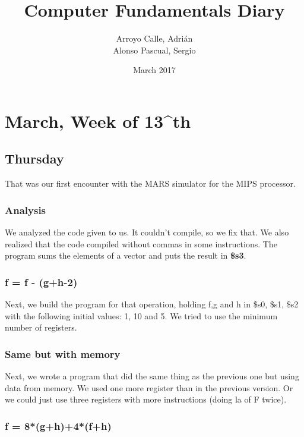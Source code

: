 \documentclass{report}
\title{Computer Fundamentals Diary}
\author{Arroyo Calle, Adrián \\ Alonso Pascual, Sergio}
\date{March 2017}
\begin{document}
\maketitle

\tableofcontents

\chapter{March, Week of 13^{th}}

\section{Thursday}

That was our first encounter with the MARS simulator for the MIPS processor.

\subsection{Analysis}

We analyzed the code given to us. It couldn't compile, so we fix that. We also realized that the code compiled without commas in some instructions. The program sums the elements of a vector and puts the result in \textbf{\$s3}.

\subsection{f = f - (g+h-2) }

Next, we build the program for that operation, holding f,g and h in \$s0, \$s1, \$s2 with the following initial values: 1, 10 and 5. We tried to use the minimum number of registers.



\subsection{Same but with memory}

Next, we wrote a program that did the same thing as the previous one but using data from memory. We used one more register than in the previous version. Or we could just use three registers with more instructions (doing la of F twice).



\subsection{f = 8*(g+h)+4*(f+h)}
\end{document}
